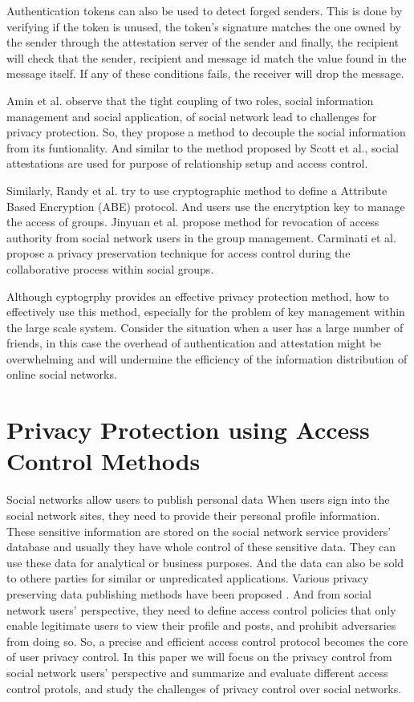 \documentclass[12pt]{article}
\begin{document}
Authentication tokens can also be used to detect forged senders. This
is done by verifying if the token is unused, the token's signature
matches the one owned by the sender through the attestation server of
the sender and finally, the recipient will check that the sender,
recipient and message id match the value found in the message
itself. If any of these conditions fails, the receiver will drop the
message. 

Amin et al. \cite{lockr} observe that the tight coupling of two roles,
social information management and social application, of social
network lead to challenges for privacy protection. So, they propose a
method to decouple the social information from its
funtionality. And similar to the method proposed by Scott et
al.\cite{reliable_email}, social attestations are used for purpose of
relationship setup and access control. 

Similarly, Randy et al. \cite{persona} try to use cryptographic method
to define a Attribute Based Encryption (ABE) protocol. And users use
the encrytption key to manage the access of groups. Jinyuan et
al. \cite{revocation-management} propose method for revocation of
access authority from social network users in the group
management. Carminati et al. \cite{crypto-collaborative-ac} propose a
privacy preservation technique for access control during the
collaborative process within social groups. 

Although cyptogrphy provides an effective privacy protection
method, how to effectively use this method, especially for the problem
of key management within the large scale system. Consider the
situation when a user has a large number of friends, in this case the
overhead of authentication and attestation might be overwhelming and
will undermine the efficiency of the information distribution of
online social networks. 

%
%
\section{Privacy Protection using Access Control Methods \label{sec:accon}}
Social networks allow users to publish personal data When users sign
into the social network sites, they need to provide their personal
profile information. These sensitive information are stored on the
social network service providers' database and usually they have whole
control of these sensitive data. They can use these data for
analytical or business purposes. And the data can also be sold to
othere parties for similar or unpredicated applications. Various
privacy preserving data publishing methods have been proposed
\cite{ppdp-survey}. And from social network users' perspective, they
need to define access control policies that only enable legitimate
users to view their profile and posts, and prohibit adversaries from
doing so. So, a precise and efficient access control protocol becomes
the core of user privacy control. In this paper we will focus on the
privacy control from social network users' perspective and summarize
and evaluate different access control protols, and study the
challenges of privacy control over social networks.
\end{document}
